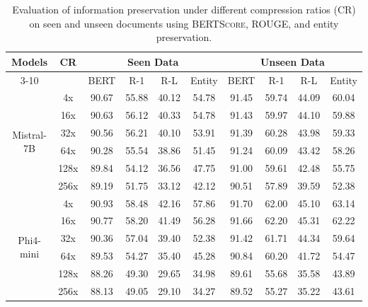 \documentclass{applemlr}
\numberwithin{equation}{section}
\begin{document}
\begin{table}[H]
\footnotesize
\centering
\begin{tabular}{c|c|cccc|cccc}
\hline
\multirow{2}{*}{Models} & \multirow{2}{*}{CR}
& \multicolumn{4}{c|}{Seen Data}
& \multicolumn{4}{c}{Unseen Data} \\
\cline{3-10}
& & BERT & R-1 & R-L & Entity
  & BERT & R-1 & R-L & Entity \\
\hline
\multirow{6}{*}{Mistral-7B}& 4x & 90.67 & 55.88 & 40.12 & 54.78 & 91.45 & 59.74 & 44.09 & 60.04 \\
& 16x & 90.63 & 56.12 & 40.33 & 54.78 & 91.43 & 59.97 & 44.10 & 59.88 \\
& 32x & 90.56 & 56.21 & 40.10 & 53.91 & 91.39 & 60.28 & 43.98 & 59.33 \\
& 64x & 90.28 & 55.54 & 38.86 & 51.45 & 91.24 & 60.09 & 43.42 & 58.26 \\
& 128x & 89.84 & 54.12 & 36.56 & 47.75 & 91.00 & 59.61 & 42.48 & 55.75 \\
& 256x & 89.19 & 51.75 & 33.12 & 42.12 & 90.51 & 57.89 & 39.59 & 52.38 \\
\hline
\multirow{6}{*}{Phi4-mini} & 4x & 90.93 & 58.48 & 42.16 & 57.86 & 91.70 & 62.00 & 45.10 & 63.14 \\
 & 16x & 90.77 & 58.20 & 41.49 & 56.28 & 91.66 & 62.20 & 45.31 & 62.22 \\
 & 32x & 90.36 & 57.04 & 39.40 & 52.38 & 91.42 & 61.71 & 44.34 & 59.64 \\
 & 64x & 89.53 & 54.27 & 35.40 & 45.28 & 90.84 & 60.20 & 41.72 & 54.47 \\
 & 128x & 88.26 & 49.30 & 29.65 & 34.98 & 89.61 & 55.68 & 35.58 & 43.89 \\
 & 256x & 88.13 & 49.05 & 29.10 & 34.27 & 89.52 & 55.27 & 35.22 & 43.61 \\
\hline
\end{tabular}
\caption{Evaluation of information preservation under different compression ratios (CR) 
on seen and unseen documents using \textsc{BERTScore}, \textsc{ROUGE}, and entity preservation.
}
\label{paraphrase_performance}
\end{table}
\end{document}
